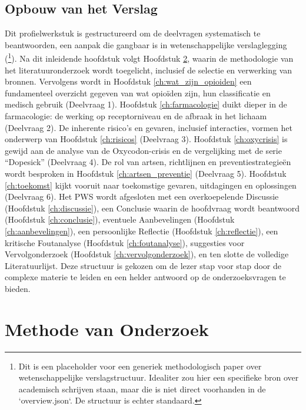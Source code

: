 \documentclass[11pt, a4paper]{report} %
\begin{document}
\section{Opbouw van het Verslag}
Dit profielwerkstuk is gestructureerd om de deelvragen systematisch te beantwoorden, een aanpak die gangbaar is in wetenschappelijke verslaglegging (\cite{SomeMethodologyPaperOnReportWriting}\footnote{Dit is een placeholder voor een generiek methodologisch paper over wetenschappelijke verslagstructuur. Idealiter zou hier een specifieke bron over academisch schrijven staan, maar die is niet direct voorhanden in de `overview.json`. De structuur is echter standaard.}). Na dit inleidende hoofdstuk volgt Hoofdstuk \ref{ch:methode}, waarin de methodologie van het literatuuronderzoek wordt toegelicht, inclusief de selectie en verwerking van bronnen. Vervolgens wordt in Hoofdstuk \ref{ch:wat_zijn_opioiden} een fundamenteel overzicht gegeven van wat opioïden zijn, hun classificatie en medisch gebruik (Deelvraag 1). Hoofdstuk \ref{ch:farmacologie} duikt dieper in de farmacologie: de werking op receptorniveau en de afbraak in het lichaam (Deelvraag 2). De inherente risico's en gevaren, inclusief interacties, vormen het onderwerp van Hoofdstuk \ref{ch:risicos} (Deelvraag 3). Hoofdstuk \ref{ch:oxycrisis} is gewijd aan de analyse van de Oxycodon-crisis en de vergelijking met de serie \enquote{Dopesick} (Deelvraag 4). De rol van artsen, richtlijnen en preventiestrategieën wordt besproken in Hoofdstuk \ref{ch:artsen_preventie} (Deelvraag 5). Hoofdstuk \ref{ch:toekomst} kijkt vooruit naar toekomstige gevaren, uitdagingen en oplossingen (Deelvraag 6). Het PWS wordt afgesloten met een overkoepelende Discussie (Hoofdstuk \ref{ch:discussie}), een Conclusie waarin de hoofdvraag wordt beantwoord (Hoofdstuk \ref{ch:conclusie}), eventuele Aanbevelingen (Hoofdstuk \ref{ch:aanbevelingen}), een persoonlijke Reflectie (Hoofdstuk \ref{ch:reflectie}), een kritische Foutanalyse (Hoofdstuk \ref{ch:foutanalyse}), suggesties voor Vervolgonderzoek (Hoofdstuk \ref{ch:vervolgonderzoek}), en ten slotte de volledige Literatuurlijst. Deze structuur is gekozen om de lezer stap voor stap door de complexe materie te leiden en een helder antwoord op de onderzoeksvragen te bieden.


\chapter{Methode van Onderzoek}
\label{ch:methode}
\end{document}

